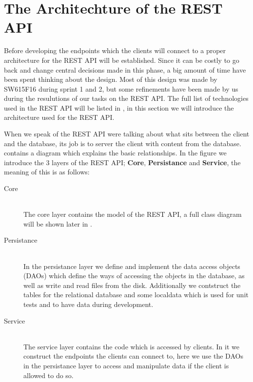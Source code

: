 \section{The Architechture of the REST API}
Before developing the endpoints which the clients will connect to a proper architecture for the REST API will be established. 
Since it can be costly to go back and change central decisions made in this phase, a big amount of time have been spent thinking about the design. 
Most of this design was made by SW615F16 during sprint 1 and 2, but some refinements have been made by us during the resulutions of our tasks on the REST API. 
The full list of technologies used in the REST API will be listed in , in this section we will introduce the architecture used for the REST API. 

When we speak of the REST API were talking about what sits between the client and the database, its job is to server the client with content from the database. 
 contains a diagram which explains the basic relationships. 
In the figure we introduce the 3 layers of the REST API; \textbf{Core}, \textbf{Persistance} and \textbf{Service}, the meaning of this is as follows:
\begin{description}
    \item[Core] \hfill \\ 
    The core layer contains the model of the REST API, a full class diagram will be shown later in .

    \item[Persistance] \hfill \\ 
    In the persistance layer we define and implement the data access objects (DAOs) which define the ways of accessing the objects in the database, as well as write and read files from the disk. 
    Additionally we contstruct the tables for the relational database and some localdata which is used for unit tests and to have data during development. 

    \item[Service] \hfill \\ 
    The service layer contains the code which is accessed by clients.
    In it we construct the endpoints the clients can connect to, here we use the DAOs in the persistance layer to access and manipulate data if the client is allowed to do so. 
\end{description}

